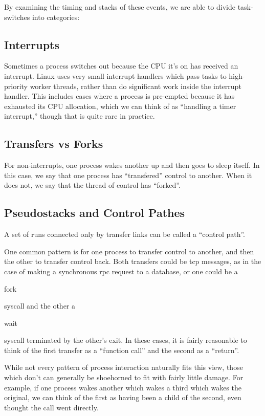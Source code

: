 \documentclass[10pt]{article}
\begin{document}
By examining the timing and stacks of these events, we are able to divide task-switches into categories:

\subsection{Interrupts}

Sometimes a process switches out because the CPU it's on has received an interrupt.  Linux uses very small interrupt handlers which pass tasks to high-priority worker threads, rather than do significant work inside the interrupt handler.  This includes cases where a process is pre-empted because it has exhausted its CPU allocation, which we can think of as ``handling a timer interrupt,'' though that is quite rare in practice.

\subsection{Transfers vs Forks}

For non-interrupts, one process wakes another up and then goes to sleep itself.  In this case, we say that one process has ``transfered'' control to another.  When it does not, we say that the thread of control has ``forked''.

\subsection{Pseudostacks and Control Pathes}

A set of runs connected only by transfer links can be called a ``control path''.

One common pattern is for one process to transfer control to another, and then the other to transfer control back.  Both transfers could be tcp messages, as in the case of making a synchronous rpc request to a database, or one could be a \begin{tt}fork\end{tt} syscall and the other a \begin{tt}wait\end{tt} syscall terminated by the other's exit.  In these cases, it is fairly reasonable to think of the first transfer as a ``function call'' and the second as a ``return''.

While not every pattern of process interaction naturally fits this view, those which don't can generally be shoehorned to fit with fairly little damage.  For example, if one process wakes another which wakes a third which wakes the original, we can think of the first as having been a child of the second, even thought the call went directly.
\end{document}
